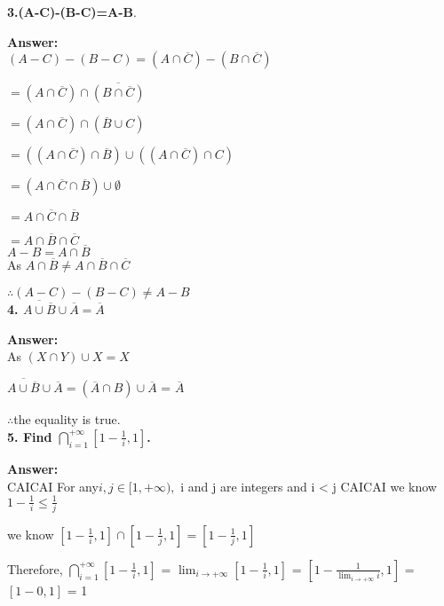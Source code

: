 \documentclass{article}
\begin{document}
\begin{large}
\textbf{3.(A-C)-(B-C)=A-B}.

\textbf{Answer:} \\

$(A-C)-(B-C) = (A \cap \overline{C}) - (B \cap \overline{C})$

            $= (A \cap \overline{C}) \cap \overline{(B \cap \overline{C})}$
            
            $= (A \cap \overline{C}) \cap (\overline{B} \cup C)$
            
            $= ((A \cap \overline{C}) \cap \overline{B}) \cup ((A \cap \overline{C}) \cap C)$
            
            $= (A \cap \overline{C} \cap \overline{B}) \cup \emptyset$
            
            $= A \cap \overline{C} \cap \overline{B}$
            
            $= A \cap \overline{B} \cap \overline{C}$\\

$A-B = A \cap \overline{B}$\\

As $A \cap \overline{B} \neq A \cap \overline{B} \cap \overline{C}$

$\therefore (A-C)-(B-C) \neq A-B$\\

\textbf{4. $\overline{A\cup \overline{B}} \cup \overline{A}=\overline{A}$}

\textbf{Answer:} \\

As $(X \cap Y) \cup X = X$

$\overline{A\cup \overline{B}} \cup \overline{A} = (\overline{A} \cap B) \cup \overline{A}$
                                                 = $\overline{A}$

$\therefore $the equality is true.\\

\textbf{5. Find $\bigcap\limits_{i=1}^{+\infty}[1-\frac{1}{i}, 1]$.}

\textbf{Answer:} \\

             CAICAI
For any$ i, j \in [1, +\infty),$ i and j are integers and i < j
                         CAICAI
we know $1 - \frac{1}{i} \le \frac{1}{j}$

we know $[1 - \frac{1}{i}, 1] \cap [1 - \frac{1}{j},1] = [1 - \frac{1}{j},1]$

Therefore, $\bigcap\limits_{i=1}^{+\infty}[1-\frac{1}{i}, 1]$ = $\lim_{i\to + \infty} [1 - \frac{1}{i},1]$
                                                              = $[1 - \frac{1}{\lim_{i\to + \infty}i}, 1]$
                                                              = $[1 - 0, 1]$
                                                              = 1\\



\end{large}
\end{document}
